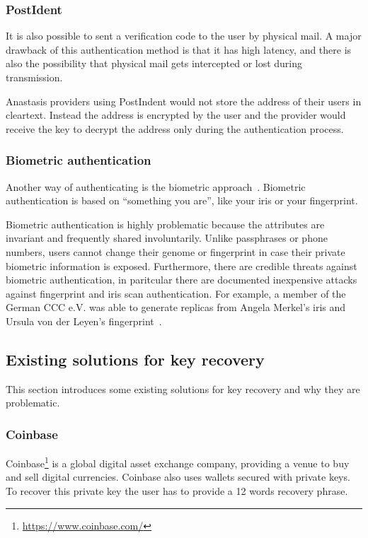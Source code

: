 \subsubsection{PostIdent}

It is also possible to sent a verification code to the user by
physical mail. A major drawback of this authentication method is
that it has high latency, and there is also the possibility that
physical mail gets intercepted or lost during transmission.

Anastasis providers using PostIndent would not store the address of
their users in cleartext. Instead the address is encrypted by the user
and the provider would receive the key to decrypt the address only
during the authentication process.

\subsubsection{Biometric authentication}

Another way of authenticating is the biometric
approach~\cite{biometric_auth}. Biometric authentication is based on
``something you are'', like your iris or your fingerprint.

Biometric authentication is highly problematic because the attributes
are invariant and frequently shared involuntarily.  Unlike passphrases
or phone numbers, users cannot change their genome or fingerprint in
case their private biometric information is exposed.  Furthermore,
there are credible threats against biometric authentication, in
paritcular there are documented inexpensive attacks against
fingerprint and iris scan authentication. For example, a member of the
German CCC e.V. was able to generate replicas from Angela Merkel's
iris and Ursula von der Leyen's fingerprint~\cite{ccc_merkel}.



\subsection{Existing solutions for key recovery}

This section introduces some existing solutions for key recovery and
why they are problematic.


\subsubsection{Coinbase}

Coinbase\footnote{\url{https://www.coinbase.com/}} is a global digital
asset exchange company, providing a venue to buy and sell digital
currencies. Coinbase also uses wallets secured with private keys. To
recover this private key the user has to provide a 12 words recovery
phrase.

